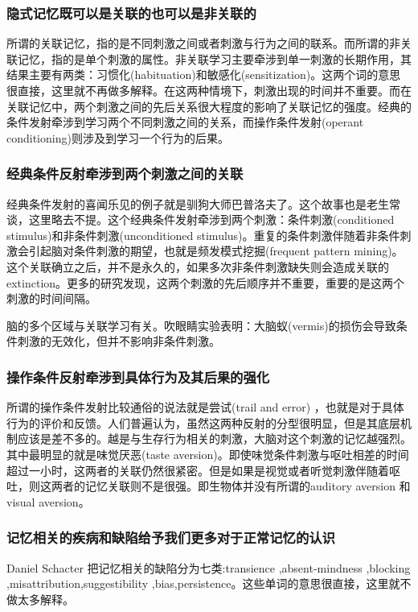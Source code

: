 \documentclass[UTF8,nofonts]{ctexart}
\begin{document}
\subsubsection{隐式记忆既可以是关联的也可以是非关联的}
所谓的关联记忆，指的是不同刺激之间或者刺激与行为之间的联系。而所谓的非关联记忆，指的是单个刺激的属性。非关联学习主要牵涉到单一刺激的长期作用，其结果主要有两类：习惯化(habituation)和敏感化(sensitization)。这两个词的意思很直接，这里就不再做多解释。在这两种情境下，刺激出现的时间并不重要。而在关联记忆中，两个刺激之间的先后关系很大程度的影响了关联记忆的强度。经典的条件发射牵涉到学习两个不同刺激之间的关系，而操作条件发射(operant conditioning)则涉及到学习一个行为的后果。
\subsubsection{经典条件反射牵涉到两个刺激之间的关联}
经典条件发射的喜闻乐见的例子就是驯狗大师巴普洛夫了。这个故事也是老生常谈，这里略去不提。这个经典条件发射牵涉到两个刺激：条件刺激(conditioned stimulus)和非条件刺激(unconditioned stimulus)。重复的条件刺激伴随着非条件刺激会引起脑对条件刺激的期望，也就是频发模式挖掘(frequent pattern mining)。这个关联确立之后，并不是永久的，如果多次非条件刺激缺失则会造成关联的extinction。更多的研究发现，这两个刺激的先后顺序并不重要，重要的是这两个刺激的时间间隔。
\par
脑的多个区域与关联学习有关。吹眼睛实验表明：大脑蚁(vermis)的损伤会导致条件刺激的无效化，但并不影响非条件刺激。
\subsubsection{操作条件反射牵涉到具体行为及其后果的强化}
所谓的操作条件发射比较通俗的说法就是尝试(trail and error) ，也就是对于具体行为的评价和反馈。人们普遍认为，虽然这两种反射的分型很明显，但是其底层机制应该是差不多的。越是与生存行为相关的刺激，大脑对这个刺激的记忆越强烈。其中最明显的就是味觉厌恶(taste aversion)。即使味觉条件刺激与呕吐相差的时间超过一小时，这两者的关联仍然很紧密。但是如果是视觉或者听觉刺激伴随着呕吐，则这两者的记忆关联则不是很强。即生物体并没有所谓的auditory aversion 和visual aversion。
\subsubsection{记忆相关的疾病和缺陷给予我们更多对于正常记忆的认识}
Daniel Schacter 把记忆相关的缺陷分为七类:transience ,absent-mindness ,blocking ,misattribution,suggestibility ,bias,persistence。这些单词的意思很直接，这里就不做太多解释。
\newpage
\end{document}
